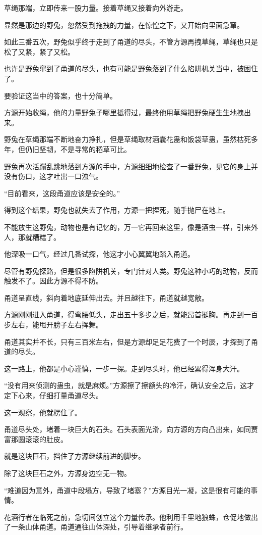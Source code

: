 \begin{this_body}
草绳那端，立即传来一股力量。接着草绳又接着向外游走。

显然是那边的野兔，忽然受到拖拽的力量，在惊惶之下，又开始向里面急窜。

如此三番五次，野兔似乎终于走到了甬道的尽头，不管方源再拽草绳，草绳也只是松了又紧，紧了又松。

也许是野兔窜到了甬道的尽头，也有可能是野兔落到了什么陷阱机关当中，被困住了。

要验证这当中的答案，也十分简单。

方源开始收绳，他的力量野兔子哪里抵得过，最终他用草绳把野兔硬生生地拽出来。

野兔在草绳那端不断地奋力挣扎，但是草绳取材酒囊花蛊和饭袋草蛊，虽然枯死多年，但仍旧坚韧，不是寻常的稻草可比。

野兔再次活蹦乱跳地落到方源的手中，方源细细地检查了一番野兔，见它的身上并没有伤口，这才吐出一口浊气。

“目前看来，这段甬道应该是安全的。”

得到这个结果，野兔也就失去了作用，方源一把捏死，随手抛尸在地上。

不能放生这野兔，动物也是有记忆的，万一它再回来这里，像是酒虫一样，引来外人，那就糟糕了。

他深吸一口气，经过几番试探，他这才小心翼翼地踏入甬道。

尽管有野兔探路，但是很多陷阱机关，专门针对人类。野兔这种小巧的动物，反而触发不了。因此方源不得不防。

甬道呈直线，斜向着地底延伸出去。并且越往下，甬道就越宽敞。

方源刚刚进入甬道，得弯腰低头，走出五十多步之后，就能昂首挺胸。再走到一百步左右，能甩开膀子左右挥舞。

甬道其实并不长，只有三百米左右，但是方源却足足花费了一个时辰，才探到了甬道的尽头。

这一路上，他都是小心谨慎，一步一探。走到尽头时，他已经累得浑身大汗。

“没有用来侦测的蛊虫，就是麻烦。”方源擦了擦额头的冷汗，确认安全之后，这才定下心来，仔细打量甬道尽头。

这一观察，他就楞住了。

甬道尽头处，堵着一块巨大的石头。石头表面光滑，向方源的方向凸出来，如同贾富那圆滚滚的肚皮。

就是这块巨石，挡住了方源继续前进的脚步。

除了这块巨石之外，方源身边空无一物。

“难道因为意外，甬道中段塌方，导致了堵塞？”方源目光一凝，这是很有可能的事情。

花酒行者在临死之前，急切间创立这个力量传承。他利用千里地狼蛛，仓促地做出了一条山体甬道。甬道通往山体深处，引导着继承者前行。


\end{this_body}
